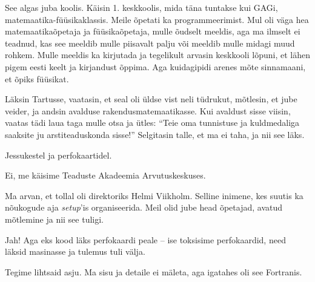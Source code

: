 

See algas juba koolis. Käisin 1. keskkoolis, mida täna tuntakse kui GAGi, 
matemaatika-füüsikaklassis. Meile õpetati ka programmeerimist. Mul oli väga 
hea matemaatikaõpetaja ja füüsikaõpetaja, mulle õudselt meeldis, aga ma 
ilmselt ei teadnud, kas see meeldib mulle piisavalt palju või meeldib mulle midagi 
muud rohkem. Mulle meeldis ka kirjutada ja tegelikult arvasin 
keskkooli lõpuni, et lähen pigem eesti keelt ja kirjandust 
õppima. Aga kuidagipidi arenes mõte sinnamaani, et õpiks 
füüsikat. 

Läksin Tartusse, vaatasin, et seal oli üldse vist neli tüdrukut, 
mõtlesin, et jube veider, ja andsin avalduse rakendusmatemaatikasse. 
Kui avaldust sisse viisin, vaatas tädi laua taga mulle otsa ja 
ütles: \enquote{Teie oma tunnistuse ja kuldmedaliga saaksite ju 
arstiteaduskonda sisse!} Selgitasin talle, et ma ei taha, ja nii see 
läks. 


Jessukestel ja perfokaartidel. 


Ei, me käisime Teaduste Akadeemia Arvutuskeskuses.


Ma arvan, et tollal oli direktoriks Helmi Viikholm. 
Selline inimene, kes suutis ka nõukogude aja \emph{setup}'is 
organiseerida. Meil olid jube head õpetajad, avatud mõtlemine ja 
nii see tuligi.


Jah! Aga eks kood läks perfokaardi peale -- ise toksisime 
perfokaardid, need läksid masinasse ja tulemus tuli välja. 


Tegime lihtsaid asju. Ma sisu ja detaile ei mäleta, aga igatahes oli 
see Fortranis. 


